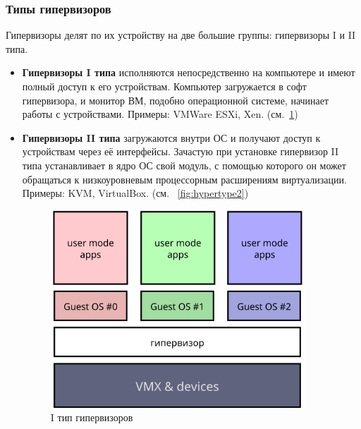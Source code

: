 \documentclass[a4paper,12pt]{extarticle}
\begin{document}
	\subsubsection{Типы гипервизоров} \label{sssec:hyptype}
	Гипервизоры делят по их устройству на две большие группы: гипервизоры I и II типа.
	\begin{itemize}
		\item \textbf{Гипервизоры I типа} исполняются непосредственно на компьютере и имеют полный доступ к его устройствам. Компьютер загружается в софт гипервизора, и монитор ВМ, подобно операционной системе, начинает работы с устройствами. Примеры: VMWare ESXi, Xen. (см.~\cref{fig:hypertype1})
		\item \textbf{Гипервизоры II типа} загружаются внутри ОС и получают доступ к устройствам через её интерфейсы. Зачастую при установке гипервизор II типа устанавливает в ядро ОС свой модуль, с помощью которого он может обращаться к низкоуровневым процессорным расширениям виртуализации. Примеры: KVM, VirtualBox. (см. ~\cref{fig:hypertype2})
		\begin{figure}[htb]
			\centering
			\begin{minipage}{0.45\textwidth}
				\centering
				\includegraphics[width=0.9\textwidth]{../diagrams/hyper_type1} %
				\caption{I тип гипервизоров}
				\label{fig:hypertype1}
			\end{minipage}\hfill
			\begin{minipage}{0.45\textwidth}
				\centering

\end{minipage}
\end{figure}
\end{itemize}
\end{document}
